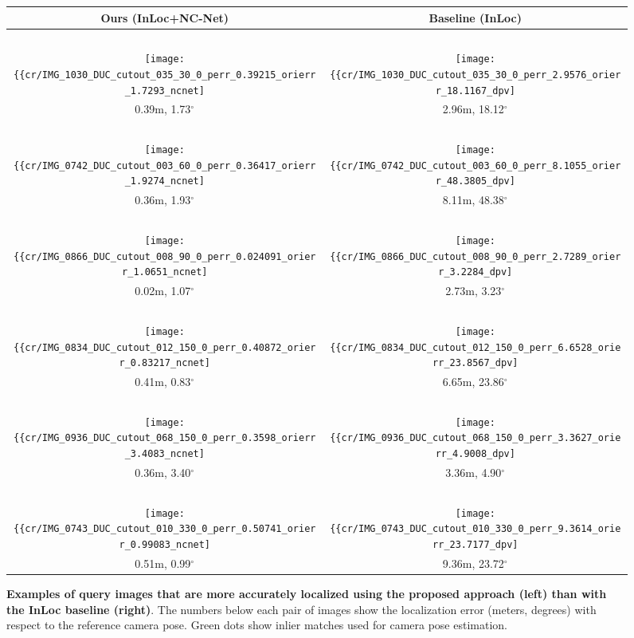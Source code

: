 \documentclass{article}
\begin{document}
\begin{figure}[tbp]
  \centering
  \begingroup
  \renewcommand{\arraystretch}{0.5}
  \begin{tabular}{@{\hskip 1pt}c@{\hskip 6pt}|@{\hskip 6pt}c@{\hskip 1pt}}
    Ours (InLoc+NC-Net) & Baseline (InLoc) \\ \hline
     ~ & ~ \\ 
    \texttt{[image: \{\{cr/IMG\_1030\_DUC\_cutout\_035\_30\_0\_perr\_0.39215\_orierr\_1.7293\_ncnet]}}} &    \texttt{[image: \{\{cr/IMG\_1030\_DUC\_cutout\_035\_30\_0\_perr\_2.9576\_orierr\_18.1167\_dpv]}}} \\
    0.39m, 1.73$^\circ$ & 2.96m, 18.12$^\circ$ \\ \hline
    ~ & ~ \\ 
    \texttt{[image: \{\{cr/IMG\_0742\_DUC\_cutout\_003\_60\_0\_perr\_0.36417\_orierr\_1.9274\_ncnet]}}} &    \texttt{[image: \{\{cr/IMG\_0742\_DUC\_cutout\_003\_60\_0\_perr\_8.1055\_orierr\_48.3805\_dpv]}}} \\
    0.36m, 1.93$^\circ$ & 8.11m, 48.38$^\circ$ \\ \hline
    ~ & ~ \\ 
    \texttt{[image: \{\{cr/IMG\_0866\_DUC\_cutout\_008\_90\_0\_perr\_0.024091\_orierr\_1.0651\_ncnet]}}} &    \texttt{[image: \{\{cr/IMG\_0866\_DUC\_cutout\_008\_90\_0\_perr\_2.7289\_orierr\_3.2284\_dpv]}}} \\
    0.02m, 1.07$^\circ$ & 2.73m, 3.23$^\circ$ \\ \hline
    ~ & ~ \\ 
    \texttt{[image: \{\{cr/IMG\_0834\_DUC\_cutout\_012\_150\_0\_perr\_0.40872\_orierr\_0.83217\_ncnet]}}} &    \texttt{[image: \{\{cr/IMG\_0834\_DUC\_cutout\_012\_150\_0\_perr\_6.6528\_orierr\_23.8567\_dpv]}}} \\
    0.41m, 0.83$^\circ$ & 6.65m, 23.86$^\circ$ \\ \hline
    ~ & ~ \\ 
    \texttt{[image: \{\{cr/IMG\_0936\_DUC\_cutout\_068\_150\_0\_perr\_0.3598\_orierr\_3.4083\_ncnet]}}} &    \texttt{[image: \{\{cr/IMG\_0936\_DUC\_cutout\_068\_150\_0\_perr\_3.3627\_orierr\_4.9008\_dpv]}}} \\
    0.36m, 3.40$^\circ$ & 3.36m, 4.90$^\circ$ \\ \hline
    ~ & ~ \\ 
    \texttt{[image: \{\{cr/IMG\_0743\_DUC\_cutout\_010\_330\_0\_perr\_0.50741\_orierr\_0.99083\_ncnet]}}} &    \texttt{[image: \{\{cr/IMG\_0743\_DUC\_cutout\_010\_330\_0\_perr\_9.3614\_orierr\_23.7177\_dpv]}}} \\
    0.51m, 0.99$^\circ$ & 9.36m, 23.72$^\circ$ 
  \end{tabular}
  \endgroup
  \vspace{2pt}
  \caption{{\bf Examples of query images that are more accurately localized using the proposed approach (left) than with the InLoc baseline (right)}. The numbers below each pair of images show the localization error (meters, degrees) with respect to the reference camera pose. Green dots show inlier matches used for camera pose estimation.}
  \label{fig:densePV}
\end{figure}
\end{document}
